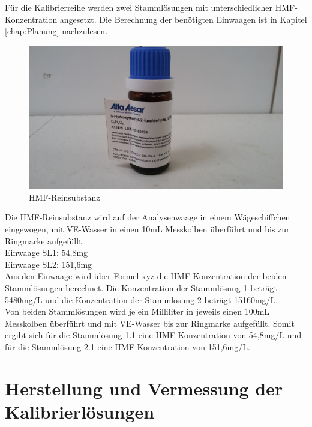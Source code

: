 Für die Kalibrierreihe werden zwei Stammlösungen mit unterschiedlicher HMF-Konzentration angesetzt. Die Berechnung der benötigten Einwaagen ist in Kapitel \ref{chap:Planung} nachzulesen.\\
\begin{figure}[htbp]
	\centering
		\includegraphics[width=1.00\textwidth]{../Bilder/20150504_140724.jpg}
	\caption{HMF-Reinsubstanz}
	\label{fig:HMF-Reinsubstanz}
\end{figure}
Die HMF-Reinsubstanz wird auf der Analysenwaage in einem Wägeschiffchen eingewogen, mit VE-Wasser in einen 10mL Messkolben überführt und bis zur Ringmarke aufgefüllt.\\

Einwaage SL1: 54,8mg\\
Einwaage SL2: 151,6mg\\

Aus den Einwaage wird über Formel xyz die HMF-Konzentration der beiden Stammlösungen berechnet. Die Konzentration der Stammlösung 1 beträgt 5480mg/L und die Konzentration der Stammlösung 2 beträgt 15160mg/L.\\ 
Von beiden Stammlösungen wird je ein Milliliter in jeweils einen 100mL Messkolben überführt und mit VE-Wasser bis zur Ringmarke aufgefüllt. Somit ergibt sich für die Stammlösung 1.1 eine HMF-Konzentration von 54,8mg/L und für die Stammlösung 2.1 eine HMF-Konzentration von 151,6mg/L. 

\section{Herstellung und Vermessung der Kalibrierlösungen}

